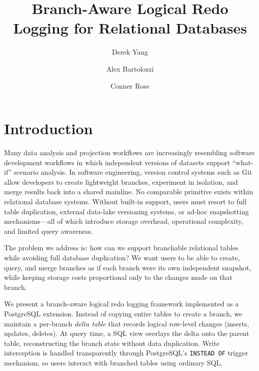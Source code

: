 \documentclass[sigplan, nonacm]{acmart}
\begin{document}
\renewcommand\footnotetextcopyrightpermission[1]{}

\title{Branch-Aware Logical Redo Logging for Relational Databases}

\author{Derek Yang}

\author{Alex Bartolozzi}

\author{Conner Rose}

\maketitle

\section{Introduction}

Many data analysis and projection workflows are increasingly resembling software development workflows in which independent versions of datasets support ``what-if'' scenario analysis. In software engineering, version control systems such as Git allow developers to create lightweight branches, experiment in isolation, and merge results back into a shared mainline. No comparable primitive exists within relational database systems. Without built-in support, users must resort to full table duplication, external data-lake versioning systems, or ad-hoc snapshotting mechanisms---all of which introduce storage overhead, operational complexity, and limited query awareness.

The problem we address is: how can we support branchable relational tables while avoiding full database duplication? We want users to be able to create, query, and merge branches as if each branch were its own independent snapshot, while keeping storage costs proportional only to the changes made on that branch.

We present a branch-aware logical redo logging framework implemented as a PostgreSQL extension. Instead of copying entire tables to create a branch, we maintain a per-branch \emph{delta table} that records logical row-level changes (inserts, updates, deletes). At query time, a SQL view overlays the delta onto the parent table, reconstructing the branch state without data duplication. Write interception is handled transparently through PostgreSQL's \texttt{INSTEAD OF} trigger mechanism, so users interact with branched tables using ordinary SQL.
\end{document}
